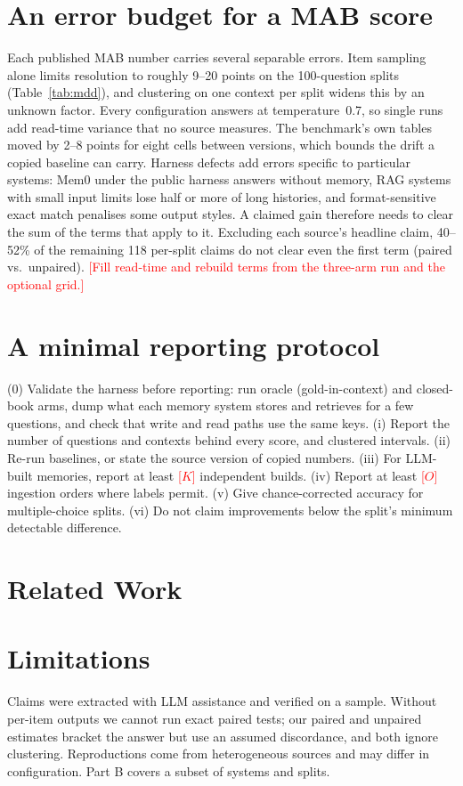 \documentclass[11pt,a4paper]{article}
\newcommand{\tbd}[1]{\textcolor{red}{[#1]}}
\begin{document}
\section{An error budget for a MAB score}
\label{sec:budget}
Each published MAB number carries several separable errors. Item sampling alone limits resolution to roughly
9--20 points on the 100-question splits (Table~\ref{tab:mdd}), and clustering on one context per split widens
this by an unknown factor. Every configuration answers at temperature~0.7, so single runs add read-time variance that
no source measures. The benchmark's own tables moved by 2--8 points for eight cells between versions, which bounds
the drift a copied baseline can carry. Harness defects add errors specific to particular systems: Mem0 under the
public harness answers without memory, RAG systems with small input limits lose half or more of long histories, and
format-sensitive exact match penalises some output styles. A claimed gain therefore needs to clear the sum of the
terms that apply to it. Excluding each source's headline claim, 40--52\% of the remaining 118 per-split claims do not clear even the first term (paired vs.\ unpaired).
\tbd{Fill read-time and rebuild terms from the three-arm run and the optional grid.}

\section{A minimal reporting protocol}
\label{sec:protocol}
(0) Validate the harness before reporting: run oracle (gold-in-context) and closed-book arms, dump what each memory
system stores and retrieves for a few questions, and check that write and read paths use the same keys.
(i) Report the number of questions and contexts behind every score, and clustered intervals. (ii) Re-run
baselines, or state the source version of copied numbers. (iii) For LLM-built memories, report at least
\tbd{$K$} independent builds. (iv) Report at least \tbd{$O$} ingestion orders where labels permit. (v) Give
chance-corrected accuracy for multiple-choice splits. (vi) Do not claim improvements below the split's minimum
detectable difference.

\section{Related Work}
\label{sec:related}


\section{Limitations}
Claims were extracted with LLM assistance and verified on a sample. Without per-item outputs we cannot run exact paired tests; our paired and unpaired
estimates bracket the answer but use an assumed discordance, and both ignore clustering. Reproductions come from heterogeneous sources and
may differ in configuration. Part B covers a subset of systems and splits.
\end{document}
